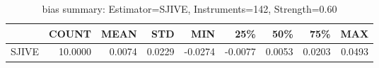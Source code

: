 \begin{table}[ht]
\centering
\caption{bias summary: Estimator=SJIVE, Instruments=142, Strength=0.60}
\begin{tabular}{lrrrrrrrr}
\toprule
 & COUNT & MEAN & STD & MIN & 25\% & 50\% & 75\% & MAX \\
\midrule
SJIVE & 10.0000 & 0.0074 & 0.0229 & -0.0274 & -0.0077 & 0.0053 & 0.0203 & 0.0493 \\
\bottomrule
\end{tabular}
\end{table}
